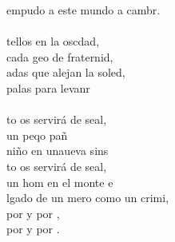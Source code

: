 \begin{cancion}
	empudo a este mundo a cambr.\\
\jump\\
	tellos en la oscdad,\\
	cada geo de fraternid,\\
	adas que alejan la soled,\\
	palas para levanr\\
\jump\\
	to os servirá de seal, \\
	un peqo pañ  \\
	niño en unaueva sins\\
	to os servirá de seal, \\
	un hom en el monte e \\
	lgado de un mero como un crimi,\\
	por  y por , \\
	por  y por .  \\
\end{cancion}%
